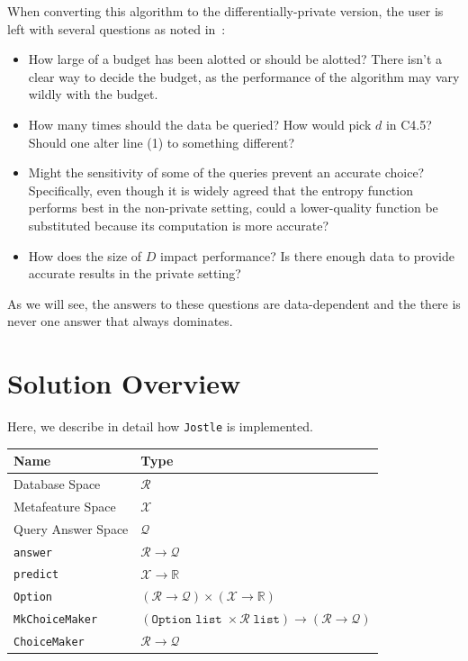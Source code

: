 \documentclass[11pt]{report}
\newcommand{\Jostle}{\texttt{Jostle}}
\renewcommand{\t}[1]{\texttt{#1}}
\begin{document}
When converting this algorithm to the differentially-private version, the user is left with several questions as noted in~\cite{Fletcher:2016}:
\begin{itemize}
\item How large of a budget has been alotted or should be alotted? There isn't a clear way to decide the budget, as the performance of the algorithm may vary wildly with the budget.
\item How many times should the data be queried? How would pick $d$ in C4.5? Should one alter line (1) to something different?
\item Might the sensitivity of some of the queries prevent an accurate choice? Specifically, even though it is widely agreed that the entropy function performs best in the non-private setting, could a lower-quality function be substituted because its computation is more accurate?
\item How does the size of $D$ impact performance? Is there enough data to provide accurate results in the private setting?
\end{itemize}
As we will see, the answers to these questions are data-dependent and the there is never one answer that always dominates.
\chapter{Solution Overview}
Here, we describe in detail how \Jostle{} is implemented.

\begin{center}
\begin{tabular}{|l|l|}
\hline
Name & Type \\ \hline
Database Space & $\mathcal{R}$ \\ \hline
Metafeature Space & $\mathcal{X}$ \\ \hline
Query Answer Space & $\mathcal{Q}$ \\ \hline
\t{answer} & $\mathcal{R} \rightarrow \mathcal{Q}$ \\ \hline
\t{predict} & $\mathcal{X} \rightarrow \mathbb{R}$ \\ \hline
\t{Option} & $(\mathcal{R} \rightarrow \mathcal{Q}) \times (\mathcal{X} \rightarrow \mathbb{R})$ \\ \hline
\t{MkChoiceMaker} & $(\t{Option list}\; \times \mathcal{R}\; \t{list}) \rightarrow (\mathcal{R} \rightarrow \mathcal{Q})$ \\ \hline
\t{ChoiceMaker} & $\mathcal{R} \rightarrow \mathcal{Q}$ \\ \hline
\end{tabular}
\end{center}
\end{document}
